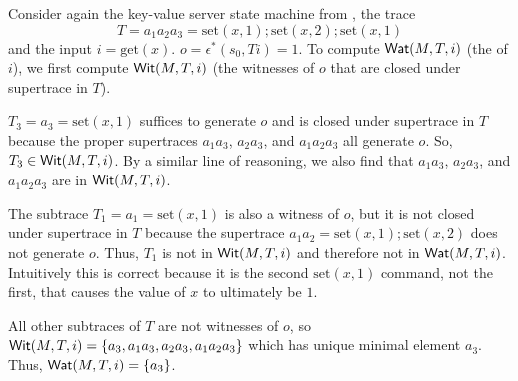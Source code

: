 \begin{example}
  \newcommand{\Mget}{\text{get}}
  \newcommand{\Mset}{\text{set}}
  Consider again the key-value server state machine from
  , the trace
  \[
    T = a_1 a_2 a_3 = \Mset(x, 1); \Mset(x, 2); \Mset(x, 1)
  \]
  and the input $i = \Mget(x)$. $o = \epsilon^*(s_0, Ti) = 1$. To compute
  $\textsf{Wat}(M, T, i)$ (the \watprovenance{} of $i$), we first compute $\textsf{Wit}(M, T,
  i)$ (the witnesses of $o$ that are closed under supertrace in $T$).


  $T_3 = a_3 = \Mset(x, 1)$ suffices to generate $o$ and is closed under
  supertrace in $T$ because the proper supertraces $a_1a_3$, $a_2a_3$, and
  $a_1a_2a_3$ all generate $o$.  So, $T_3 \in \textsf{Wit}(M, T, i)$. By a similar line
  of reasoning, we also find that $a_1a_3$, $a_2a_3$, and $a_1a_2a_3$ are in
  $\textsf{Wit}(M, T, i)$.

  The subtrace $T_1 = a_1 = \Mset(x, 1)$ is also a witness of $o$, but it is
  not closed under supertrace in $T$ because the supertrace $a_1a_2 = \Mset(x,
  1); \Mset(x, 2)$ does not generate $o$. Thus, $T_1$ is not in $\textsf{Wit}(M, T, i)$
  and therefore not in $\textsf{Wat}(M, T, i)$.  Intuitively this is correct because it
  is the second $\Mset(x, 1)$ command, not the first, that causes the value of
  $x$ to ultimately be $1$.

  All other subtraces of $T$ are not witnesses of $o$, so $\textsf{Wit}(M, T, i) =
  \{a_3, a_1a_3, a_2a_3, a_1a_2a_3\}$ which has unique minimal element $a_3$.
  Thus, $\textsf{Wat}(M, T, i) = \{a_3\}$.
\end{example}


